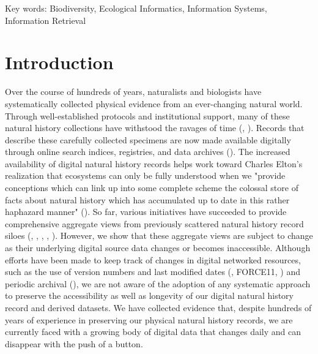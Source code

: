 \documentclass[10pt,letterpaper]{article}
\begin{document}
Key words:
Biodiversity, Ecological Informatics, Information Systems, Information Retrieval

\section*{Introduction}
Over the course of hundreds of years, naturalists and biologists have systematically collected physical evidence from an ever-changing natural world. Through well-established protocols and institutional support, many of these natural history collections have withstood the ravages of time (\cite{Hortal_2015}, \cite{Davis_1996}). Records that describe these carefully collected specimens are now made available digitally through online search indices, registries, and data archives (\cite{Page_2015}). The increased availability of digital natural history records helps work toward Charles Elton’s realization that ecosystems can only be fully understood when we "provide conceptions which can link up into some complete scheme the colossal store of facts about natural history which has accumulated up to date in this rather haphazard manner" (\cite{Elton_1927}). So far, various initiatives have succeeded to provide comprehensive aggregate views from previously scattered natural history record siloes (\cite{Rinaldo_2009}, \cite{Michener_2011}, \cite{Edwards_2000}, \cite{matsunaga2013integrated}, \cite{gbif_org_2019}). However, we show that these aggregate views are subject to change as their underlying digital source data changes or becomes inaccessible. Although efforts have been made to keep track of changes in digital networked resources, such as the use of version numbers and last modified dates (\cite{Wieczorek_2012}, FORCE11, \cite{Robertson_2014}) and periodic archival (\cite{Costello_2013}),  we are not aware of the adoption of any systematic approach to preserve the accessibility as well as longevity of our digital natural history record and derived datasets. We have collected evidence that, despite hundreds of years of experience in preserving our physical natural history records, we are currently faced with a growing body of digital data that changes daily and can disappear with the push of a button.
\end{document}
